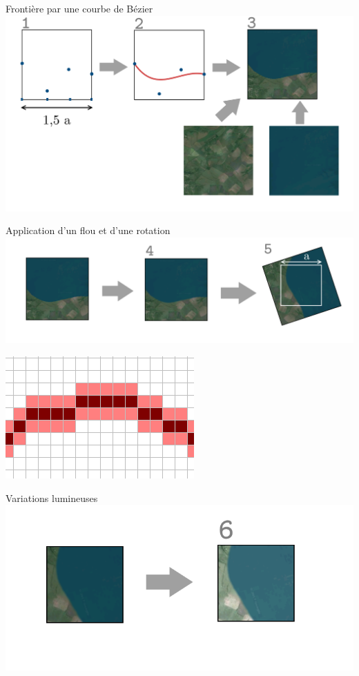 \documentclass[ignorenonframetext,]{beamer}
\begin{document}
\begin{frame}{Frontière par une courbe de Bézier}
	\includegraphics{procede1.png}
\end{frame}

\begin{frame}{Application d'un flou et d'une rotation}
	\includegraphics{procede2.png}
	\begin{center}
		\includegraphics[width=.3\linewidth]{flou.png}
	\end{center}
\end{frame}

\begin{frame}{Variations lumineuses}
	\includegraphics{procede3.png}
\end{frame}
\end{document}
